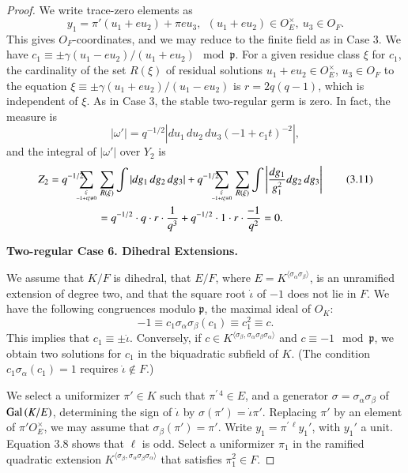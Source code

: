 \documentclass{amsart}
\newcommand\jota{{\dot\iota}}
\newcommand\pp{{\mathfrak p}}
\newcommand\Gal{\hbox{Gal\,}}
\begin{document}
\begin{proof}
We write trace-zero elements as
$$y_1 = \pi' (u_1+e u_2) + \pi e u_3,
   \ \ (u_1+e u_2)\in O_E^\times,\ u_3\in O_F.$$
This gives $O_F$-coordinates, and we may reduce to the
finite field as in Case 3.  We have $c_1 \equiv \pm \gamma (u_1-e u_2)/
(u_1+e u_2) \mod \pp$.  For a given residue class $\xi$ for $c_1$, the
cardinality of the set $R(\xi)$
of residual solutions $u_1+e u_2\in O_E^\times$, $u_3 \in O_F$
to the equation $\xi \equiv \pm \gamma (u_1+e u_2)/(u_1-e u_2)$ 
is $r=2q(q-1)$, which is independent
of $\xi$. 
As in Case 3, the stable two-regular germ
is zero.
In fact, the
measure is 
$$|\omega'| = q^{-1/2} |du_1\,du_2\,du_3 (-1+c_1 t)^{-2}|,$$
and the integral of $|\omega'|$ over $Y_2$ is
\begin{align*}
Z_2 =
q^{-1/2}\hskip -1em\sum_{\xi\atop  -1+t\xi \not\equiv0}
&\sum_{R(\xi)} \int |dg_1\,dg_2\,dg_3| + q^{-1/2}\hskip -1em 
\sum_{\xi\atop  -1+t\xi \equiv 0}
\sum_{R(\xi)} \int \left|{dg_1\over g_1^2} dg_2\,dg_3\right|\tag{3.11}\\
&= q^{-1/2}\cdot q\cdot r\cdot {1\over q^3} + q^{-1/2}\cdot 1\cdot r\cdot {-1\over q^2}
 =0.
\end{align*}

\bigskip
\centerline{\bf Two-regular Case 6. Dihedral Extensions.}
\bigskip

We assume that $K/F$ is dihedral, that $E/F$, where 
$E=K^{\langle\sigma_\alpha\sigma_\beta\rangle}$,
is an unramified extension of degree two, and that the
square root $\jota$ of $-1$ does not lie in $F$.
We have the following
congruences modulo $\pp$, the maximal ideal of $O_K$:
$$-1\equiv c_1 \sigma_\alpha\sigma_\beta(c_1) \equiv
c_1^2 \equiv c.$$
This implies that $c_1\equiv \pm \jota$.
Conversely, if $c\in K^{\langle\sigma_\beta,\sigma_\alpha
\sigma_\beta\sigma_\alpha\rangle}$ 
and $c\equiv -1 \mod \pp$, we obtain
two solutions for $c_1$ in the biquadratic subfield of $K$.
(The condition $c_1\sigma_\alpha(c_1) =1$ requires $\jota\not\in F$.)

We select a uniformizer $\pi'\in K$ such that $\pi^{\prime\,4}\in E$,
and a generator $\sigma=\sigma_\alpha\sigma_\beta$ of 
$\Gal(K/E)$, determining the sign of $\jota$ by $\sigma(\pi')
=\jota\pi'$.  Replacing $\pi'$ by an element of $\pi'O_E^\times$,
we may assume that $\sigma_\beta(\pi')=\pi'$.
Write $y_1 = \pi^{\prime\,\ell}y_1'$, with
$y_1'$ a unit.  
Equation 3.8 shows
that $\ell$ is odd.  Select a uniformizer $\pi_1$
in the ramified quadratic extension $K^{\langle\sigma_\beta,\sigma_\alpha
\sigma_\beta\sigma_\alpha
\rangle}$ that satisfies $\pi_1^2\in F$.


\end{proof}
\end{document}
